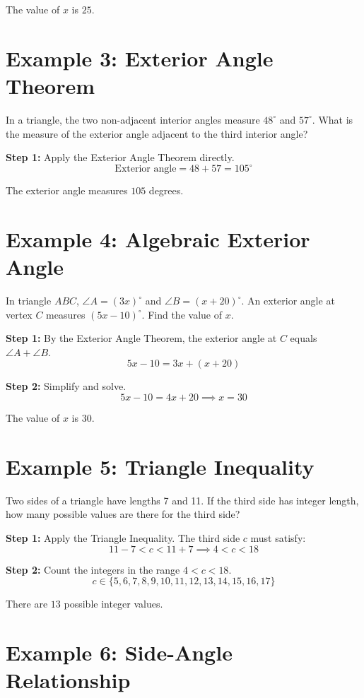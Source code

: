 \documentclass[14pt]{extarticle}
\begin{document}
The value of \(x\) is \(\boxed{25}\).

\section*{Example 3: Exterior Angle Theorem}

In a triangle, the two non-adjacent interior angles measure \(48^\circ\) and \(57^\circ\). What is the measure of the exterior angle adjacent to the third interior angle?

\textbf{Step 1:} Apply the Exterior Angle Theorem directly.
\[
\text{Exterior angle} = 48 + 57 = 105^\circ
\]

The exterior angle measures \(\boxed{105}\) degrees.

\section*{Example 4: Algebraic Exterior Angle}

In triangle \(ABC\), \(\angle A = (3x)^\circ\) and \(\angle B = (x + 20)^\circ\). An exterior angle at vertex \(C\) measures \((5x - 10)^\circ\). Find the value of \(x\).

\textbf{Step 1:} By the Exterior Angle Theorem, the exterior angle at \(C\) equals \(\angle A + \angle B\).
\[
5x - 10 = 3x + (x + 20)
\]

\textbf{Step 2:} Simplify and solve.
\[
5x - 10 = 4x + 20 \implies x = 30
\]

The value of \(x\) is \(\boxed{30}\).

\section*{Example 5: Triangle Inequality}

Two sides of a triangle have lengths 7 and 11. If the third side has integer length, how many possible values are there for the third side?

\textbf{Step 1:} Apply the Triangle Inequality. The third side \(c\) must satisfy:
\[
11 - 7 < c < 11 + 7 \implies 4 < c < 18
\]

\textbf{Step 2:} Count the integers in the range \(4 < c < 18\).
\[
c \in \{5, 6, 7, 8, 9, 10, 11, 12, 13, 14, 15, 16, 17\}
\]

There are \(\boxed{13}\) possible integer values.

\section*{Example 6: Side-Angle Relationship}
\end{document}

